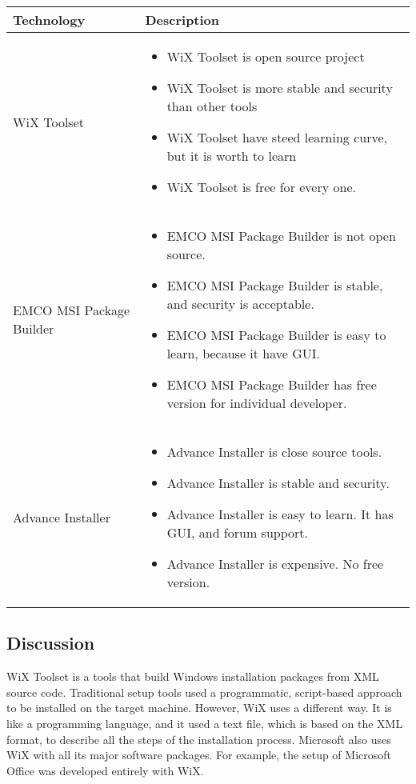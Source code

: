 \begin{center}
    \begin{tabular}{ | l | p{10cm} |}
    \hline
    Technology & Description  \\ \hline
    WiX Toolset \cite{Wix_tool} &
    \begin{itemize}
      \item WiX Toolset is open source project 
      \item WiX Toolset is more stable and security than other tools
      \item WiX Toolset have steed learning curve, but it is worth to learn
	  \item WiX	Toolset is free for every one.
    \end{itemize}\\ \hline
    EMCO MSI Package Builder \cite{EMCO_MSI} &
    \begin{itemize}
      \item EMCO MSI Package Builder is not open source. 
      \item EMCO MSI Package Builder is stable, and security is acceptable.
      \item EMCO MSI Package Builder is easy to learn, because it have GUI.
	  \item EMCO MSI Package Builder has free version for individual developer.
    \end{itemize}\\ \hline
    Advance Installer \cite{advanced_install} &
    \begin{itemize}
      \item Advance Installer is close source tools.
      \item Advance Installer is stable and security.
	  \item Advance Installer is easy to learn. It has GUI, and forum support. 
      \item Advance Installer is expensive. No free version.
    \end{itemize}\\ \hline
    \end{tabular}
\end{center}

\subsection{Discussion}
WiX Toolset is a tools that build Windows installation packages from XML source code. Traditional setup tools used a programmatic, script-based approach to be installed on the target machine. However, WiX uses a different way. It is like a programming language, and it used a text file, which is based on the XML format, to describe all the steps of the installation process. Microsoft also uses WiX with all its major software packages. For example, the setup of Microsoft Office was developed entirely with WiX. \cite{Wix_tool}

